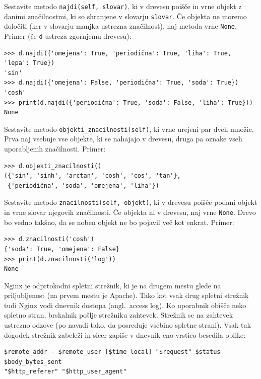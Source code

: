 \documentclass[arhiv]{../izpit}
\begin{document}
\podnaloga[10 točk]
Sestavite metodo \texttt{najdi(self, slovar)}, ki v drevesu poišče in vrne objekt z danimi značilnostmi, ki so shranjene v slovarju \texttt{slovar}. Če objekta ne moremo določiti (ker v slovarju manjka ustrezna značilnost), naj metoda vrne \texttt{None}. Primer (če \texttt{d} ustreza zgornjemu drevesu):
%
\begin{verbatim}
>>> d.najdi({'omejena': True, 'periodična': True, 'liha': True, 'lepa': True})
'sin'
>>> d.najdi({'omejena': False, 'periodična': True, 'soda': True})
'cosh'
>>> print(d.najdi({'periodična': True, 'soda': False, 'liha': True}))
None
\end{verbatim}

\podnaloga[10 točk]
Sestavite metodo \texttt{objekti\_znacilnosti(self)}, ki vrne urejeni par dveh množic. Prva naj vsebuje vse objekte, ki se nahajajo v drevesu, druga pa oznake vseh uporabljenih značilnosti. Primer:
%
\begin{verbatim}
>>> d.objekti_znacilnosti()
({'sin', 'sinh', 'arctan', 'cosh', 'cos', 'tan'},
 {'periodična', 'soda', 'omejena', 'liha'})
\end{verbatim}

\podnaloga[10 točk]
Sestavite metodo \texttt{znacilnosti(self, objekt)}, ki v drevesu poišče podani objekt in vrne slovar njegovih značilnosti. Če objekta ni v drevesu, naj vrne \texttt{None}. Drevo bo vedno takšno, da se noben objekt ne bo pojavil več kot enkrat. Primer:
%
\begin{verbatim}
>>> d.znacilnosti('cosh')
{'soda': True, 'omejena': False}
>>> print(d.znacilnosti('log'))
None
\end{verbatim}



Nginx je odprtokodni spletni strežnik, ki je na drugem mestu glede na priljubljenost (na prvem mestu je Apache). Tako kot vsak drug spletni strežnik tudi Nginx vodi dnevnik dostopa (angl.\ access log). Ko uporabnik obišče neko spletno stran, brskalnik pošlje strežniku zahtevek. Strežnik se na zahtevek ustrezno odzove (po navadi tako, da posreduje vsebino spletne strani). Vsak tak dogodek strežnik zabeleži in sicer zapiše v dnevnik eno vrstico besedila oblike:

\begin{verbatim}
$remote_addr - $remote_user [$time_local] "$request" $status $body_bytes_sent
"$http_referer" "$http_user_agent"
\end{verbatim}
\end{document}
